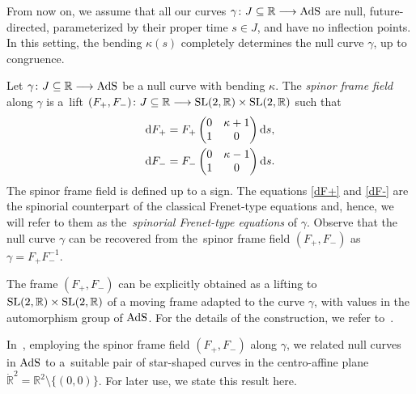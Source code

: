 \documentclass[10pt,a4paper]{amsart}
\numberwithin{equation}{section}
\def\bending{\kappa}
\def\R{\mathbb{R}}
\def\SL{{\rm SL}(2,\R)}
\def\AdS{{\rm AdS}}
\begin{document}
\begin{Remark}\label{assumptions} From now on, we assume that all our curves $\gamma\colon J\subseteq\R\longrightarrow\AdS$ are null, future-directed, parameterized by their proper time $s\in J$, and have no inflection points. In this setting, the bending $\bending(s)$ completely determines the null curve $\gamma$, up to congruence.
\end{Remark}

Let $\gamma\colon J\subseteq\R\longrightarrow\AdS$ be a null curve with bending $\bending$. The \emph{spinor frame field} along $\gamma$ is a~lift $(F_+,F_-)\colon J\subseteq\R\longrightarrow\SL\times\SL$ such that
\begin{gather}
	{\rm d}F_+ = F_+ \begin{pmatrix} 0 & \bending+1 \\ 1 & 0 \end{pmatrix}{\rm d} s,\label{dF+}\\
	{\rm d}F_- = F_- \begin{pmatrix} 0 & \bending-1 \\ 1 & 0 \end{pmatrix}{\rm d} s.\label{dF-}
\end{gather}
The spinor frame field is defined up to a sign. The equations \eqref{dF+} and \eqref{dF-} are the spinorial counterpart of the classical Frenet-type equations and, hence, we will refer to them as the~\emph{spinorial Frenet-type equations} of $\gamma$. Observe that the null curve $\gamma$ can be recovered from the~spinor frame field $(F_+,F_-)$ as
$\gamma=F_+F_-^{-1}$.

\begin{Remark} The frame $(F_+,F_-)$ can be explicitly obtained as a lifting to $\SL\times\SL$ of a moving frame adapted to the curve $\gamma$, with values in the automorphism group of $\AdS$. For the details of the construction, we refer to~\cite{MP}.
\end{Remark}

In~\cite{MP}, employing the spinor frame field $(F_+,F_-)$ along $\gamma$, we related null curves in $\AdS$ to a~suitable pair of star-shaped curves in the centro-affine plane $\dot{\R}^2=\R^2\setminus\{(0,0)\}$. For later use, we state this result here.
\end{document}
